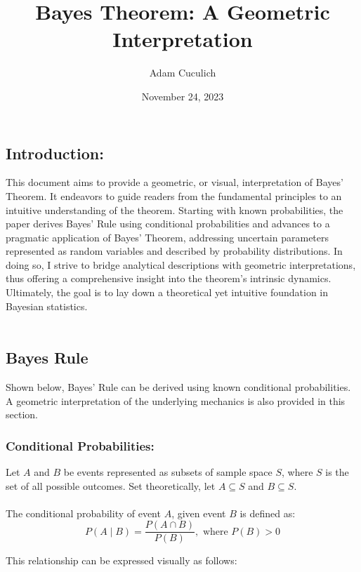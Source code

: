 \documentclass[12pt]{article}
\title{Bayes Theorem: A Geometric Interpretation}
\author{Adam Cuculich}
\date{November 24, 2023}
\begin{document}
\maketitle %

\subsection*{Introduction:}
This document aims to provide a geometric, or visual, interpretation of Bayes’ Theorem. It endeavors to guide readers from the fundamental principles to an intuitive understanding of the theorem. Starting with known probabilities, the paper derives Bayes’ Rule using conditional probabilities and advances to a pragmatic application of Bayes’ Theorem, addressing uncertain parameters represented as random variables and described by probability distributions. In doing so, I strive to bridge analytical descriptions with geometric interpretations, thus offering a comprehensive insight into the theorem’s intrinsic dynamics. Ultimately, the goal is to lay down a theoretical yet intuitive foundation in Bayesian statistics. \\\\

\newpage

\subsection*{Bayes Rule}
Shown below, Bayes' Rule can be derived using known conditional probabilities. A geometric interpretation of the underlying mechanics is also provided in this section.
\subsubsection*{Conditional Probabilities:}
Let \(A\) and \(B\) be events represented as subsets of sample space \(S\), where \(S\) is the set of all possible outcomes. Set theoretically, let  \( A \subseteq S \) and \( B \subseteq S \). \\\\
The conditional probability of event \( A \), given event \( B \) is defined as:
\begin{equation}
P(A \mid B) = \frac{P(A \cap B)}{P(B)}, \text{ where } P(B) > 0
\end{equation}

\noindent This relationship can be expressed visually as follows:\\
\end{document}

